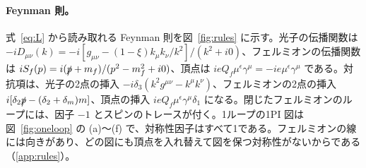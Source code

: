 \documentclass[a4paper,10pt]{ltjsarticle}
\begin{document}
\paragraph{Feynman 則。}式~\eqref{eq:L} から読み取れる Feynman 則を図~\ref{fig:rules} に示す。光子の伝播関数は $-iD_{\mu\nu}(k)=-i[g_{\mu\nu}-(1-\xi)k_\mu k_\nu/k^2]/(k^2+i0)$、フェルミオンの伝播関数は $iS_f(p)=i(\slashed p+m_f)/(p^2-m_f^2+i0)$、頂点は $ieQ_f\mu^\epsilon\gamma^\mu=-ie\mu^\epsilon\gamma^\mu$ である。対抗項は、光子の2点の挿入 $-i\delta_3(k^2g^{\mu\nu}-k^\mu k^\nu)$、フェルミオンの2点の挿入 $i[\delta_2\slashed p-(\delta_2+\delta_m)m]$、頂点の挿入 $ieQ_f\mu^\epsilon\gamma^\mu\delta_1$ になる。閉じたフェルミオンのループには、因子 $-1$ とスピンのトレースが付く。1ループの1PI 図は図~\ref{fig:oneloop} の (a)〜(f) で、対称性因子はすべて1である。フェルミオンの線には向きがあり、どの図にも頂点を入れ替えて図を保つ対称性がないからである（\ref{app:rules}）。
\end{document}
